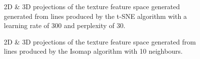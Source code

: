 \clearpage
\begin{figure}[H]
	\centering
	\caption{2D \& 3D projections of the texture feature space generated generated from lines produced by the t-SNE algorithm with a learning rate of 300 and perplexity of 30.}\label{fig:texture_SNE_mapping_lines}
\end{figure}

\begin{figure}[H]
	\centering
	\caption{2D \& 3D projections of the texture feature space generated from lines produced by the Isomap algorithm with 10 neighbours.}\label{fig:texture_iso_mapping_lines}
\end{figure}

